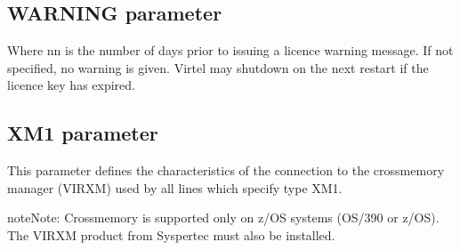 \documentclass[letterpaper,10pt,english]{sphinxmanual}
\begin{document}
\begin{sphinxVerbatim}[commandchars=\\\{\}]
\end{sphinxVerbatim}

\ignorespaces 

\subsection{WARNING parameter}
\label{\detokenize{Installation_Guide:warning-parameter}}\label{\detokenize{Installation_Guide:index-142}}
\begin{sphinxVerbatim}[commandchars=\\\{\}]
\end{sphinxVerbatim}

\sphinxAtStartPar
Where nn is the number of days prior to issuing a licence warning message. If not specified, no warning is given. Virtel may shutdown on the next restart if the licence key has expired.

\ignorespaces 

\subsection{XM1 parameter}
\label{\detokenize{Installation_Guide:xm1-parameter}}\label{\detokenize{Installation_Guide:index-143}}
\begin{sphinxVerbatim}[commandchars=\\\{\}]
   
\PYG{p}{[}\PYG{p}{]}
\end{sphinxVerbatim}

\sphinxAtStartPar
This parameter defines the characteristics of the connection to the cross\sphinxhyphen{}memory manager (VIRXM) used by all lines which specify type XM1.

\begin{sphinxadmonition}{note}{Note:}
\sphinxAtStartPar
Cross\sphinxhyphen{}memory is supported only on z/OS systems (OS/390 or z/OS). The VIRXM product from Syspertec must also be installed.
\end{sphinxadmonition}
\end{document}
